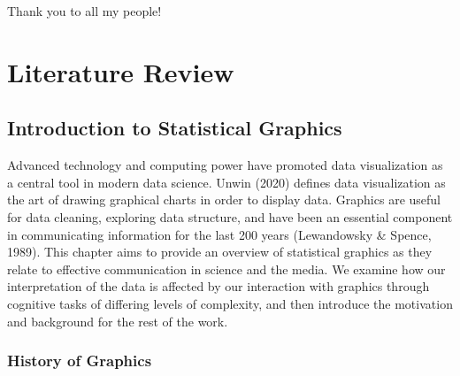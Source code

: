 \documentclass[print]{nuthesis}
\begin{document}
\begin{acknowledgments}
Thank you to all my people!
\end{acknowledgments}


\tableofcontents

\listoffigures
\listoftables

\mainmatter


\hypertarget{literature-review}{%
\chapter{Literature Review}\label{literature-review}}

\hypertarget{introduction-to-statistical-graphics}{%
\section{Introduction to Statistical Graphics}\label{introduction-to-statistical-graphics}}

Advanced technology and computing power have promoted data visualization as a central tool in modern data science. Unwin (2020) defines data visualization as the art of drawing graphical charts in order to display data.
Graphics are useful for data cleaning, exploring data structure, and have been an essential component in communicating information for the last 200 years (Lewandowsky \& Spence, 1989).
This chapter aims to provide an overview of statistical graphics as they relate to effective communication in science and the media.
We examine how our interpretation of the data is affected by our interaction with graphics through cognitive tasks of differing levels of complexity, and then introduce the motivation and background for the rest of the work.

\hypertarget{history-of-graphics}{%
\subsection{History of Graphics}\label{history-of-graphics}}
\end{document}
